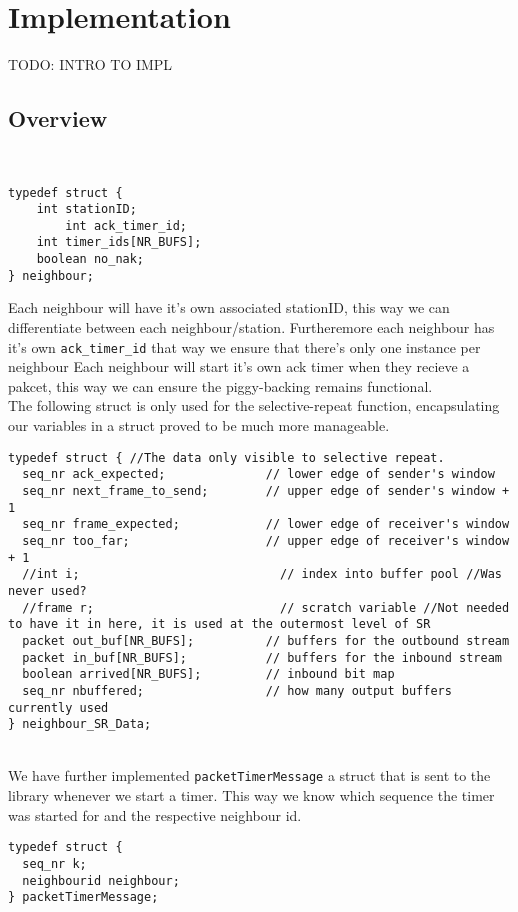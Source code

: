 \section{Implementation}
TODO: INTRO TO IMPL
\\
\subsection{Overview}
\\
\begin{lstlisting}
typedef struct {
    int stationID;
		int ack_timer_id;
    int timer_ids[NR_BUFS];
    boolean no_nak;
} neighbour;
\end{lstlisting}

Each neighbour will have it's own associated stationID,
this way we can differentiate between each neighbour/station.
Furtheremore each neighbour has it's own \texttt{ack\_timer\_id} that way we ensure that there's only one instance per neighbour
Each neighbour will start it's own ack timer when they recieve a pakcet,
this way we can ensure the piggy-backing remains functional.
\\

The following struct is only used for the selective-repeat function,
encapsulating our variables in a struct proved to be much more manageable.

\begin{lstlisting}
typedef struct { //The data only visible to selective repeat.
  seq_nr ack_expected;              // lower edge of sender's window
  seq_nr next_frame_to_send;        // upper edge of sender's window + 1
  seq_nr frame_expected;            // lower edge of receiver's window
  seq_nr too_far;                   // upper edge of receiver's window + 1
  //int i;                            // index into buffer pool //Was never used?
  //frame r;                          // scratch variable //Not needed to have it in here, it is used at the outermost level of SR
  packet out_buf[NR_BUFS];          // buffers for the outbound stream
  packet in_buf[NR_BUFS];           // buffers for the inbound stream
  boolean arrived[NR_BUFS];         // inbound bit map
  seq_nr nbuffered;                 // how many output buffers currently used
} neighbour_SR_Data;
\end{lstlisting}
\\

We have further implemented \texttt{packetTimerMessage} a struct that is sent to the library whenever we start a timer.
This way we know which sequence the timer was started for and the respective neighbour id.
\begin{lstlisting}
typedef struct {
  seq_nr k;
  neighbourid neighbour;
} packetTimerMessage;
\end{lstlisting}

